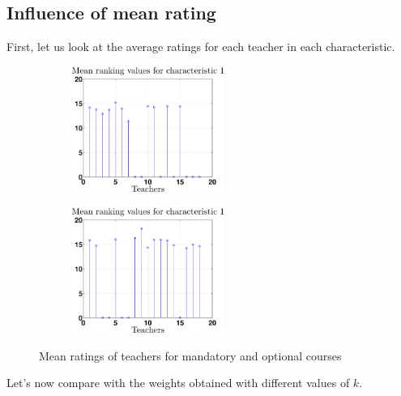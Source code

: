 \documentclass[12pt,a4paper]{article}
\begin{document}
\subsection*{Influence of mean rating}
First, let us look at the average ratings for each teacher in each characteristic.
\begin{figure}
\centering
\begin{subfigure}[b]{0.49\textwidth}
\includegraphics[width = 5cm]{noPreprocess/meanTeachersC1.eps}
\end{subfigure}
\begin{subfigure}[b]{0.49\textwidth}
\includegraphics[width = 5cm]{noPreprocess/meanTeachersC2.eps}
\end{subfigure}
\caption{Mean ratings of teachers for mandatory and optional courses}
\end{figure}

Let's now compare with the weights obtained with different values of $k$.
\end{document}
